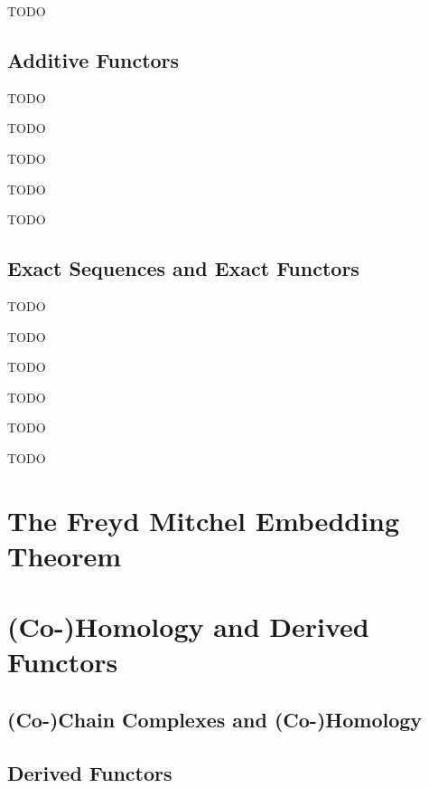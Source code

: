 	\begin{definition}[quotient]
		TODO
	\end{definition}


	\subsection{Additive Functors}

	\begin{definition}
		TODO
	\end{definition}

	\begin{lemma}
		TODO
	\end{lemma}

	\begin{lemma}
		TODO
	\end{lemma}

	\begin{theorem}
		TODO
	\end{theorem}

	\begin{proposition}
		TODO
	\end{proposition}

	\subsection{Exact Sequences and Exact Functors}

	\begin{definition}
		TODO
	\end{definition}

	\begin{lemma}
		TODO
	\end{lemma}

	\begin{definition}
		TODO
	\end{definition}

	\begin{lemma}
		TODO
	\end{lemma}

	\begin{definition}
		TODO
	\end{definition}

	\begin{lemma}
		TODO
	\end{lemma}

	\newpage
	\section{The Freyd Mitchel Embedding Theorem}

	\newpage
	\section{(Co-)Homology and Derived Functors}
	\subsection{(Co-)Chain Complexes and (Co-)Homology}
	\subsection{Derived Functors}
